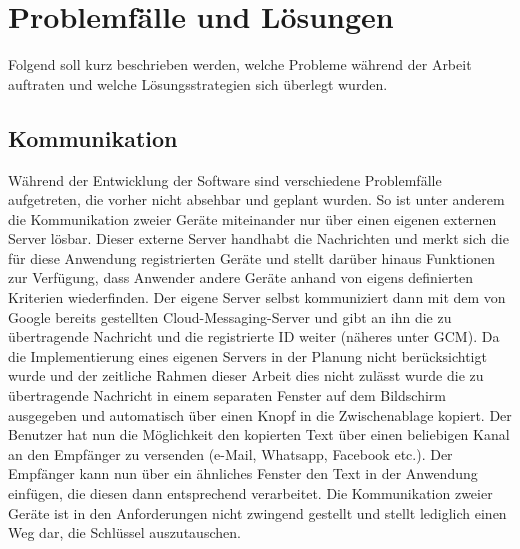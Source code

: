 \documentclass[10pt, a4paper,headsepline]{scrreprt}
\begin{document}
\chapter{Problemfälle und Lösungen}
Folgend soll kurz beschrieben werden, welche Probleme während der Arbeit auftraten und welche Lösungsstrategien sich überlegt wurden.


\section{Kommunikation}
Während der Entwicklung der Software sind verschiedene Problemfälle aufgetreten, die vorher nicht absehbar und geplant wurden. So ist unter anderem die Kommunikation zweier Geräte miteinander nur über einen eigenen externen Server lösbar. Dieser externe Server handhabt die Nachrichten und merkt sich die für diese Anwendung registrierten Geräte und stellt darüber hinaus Funktionen zur Verfügung, dass Anwender andere Geräte anhand von eigens definierten Kriterien wiederfinden. Der eigene Server selbst kommuniziert dann mit dem von Google bereits gestellten Cloud-Messaging-Server und gibt an ihn die zu übertragende Nachricht und die registrierte ID weiter (näheres unter GCM). Da die Implementierung eines eigenen Servers in der Planung nicht berücksichtigt wurde und der zeitliche Rahmen dieser Arbeit dies nicht zulässt wurde die zu übertragende Nachricht in einem separaten Fenster auf dem Bildschirm ausgegeben und automatisch über einen Knopf in die Zwischenablage kopiert. Der Benutzer hat nun die Möglichkeit den kopierten Text über einen beliebigen Kanal an den Empfänger zu versenden (e-Mail, Whatsapp, Facebook etc.). Der Empfänger kann nun über ein ähnliches Fenster den Text in der Anwendung einfügen, die diesen dann entsprechend verarbeitet. Die Kommunikation zweier Geräte ist in den Anforderungen nicht zwingend gestellt und stellt lediglich einen Weg dar, die Schlüssel auszutauschen. 
\end{document}
